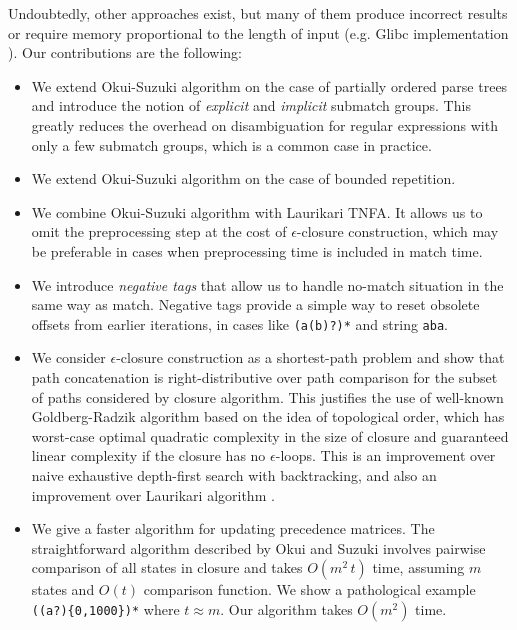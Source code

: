 \documentclass[AMA,STIX1COL]{WileyNJD-v2}
\begin{document}
Undoubtedly, other approaches exist,
but many of them produce incorrect results or require memory proportional to the length of input
(e.g. Glibc implementation \cite{Glibc}).
%
Our contributions are the following:
\begin{itemize}[itemsep=0.5em, topsep=0.5em]

    \item We extend Okui-Suzuki algorithm on the case of partially ordered parse trees
        and introduce the notion of \emph{explicit} and \emph{implicit} submatch groups.
        This greatly reduces the overhead on disambiguation
        for regular expressions with only a few submatch groups,
        which is a common case in practice.

    \item We extend Okui-Suzuki algorithm on the case of bounded repetition.

    \item We combine Okui-Suzuki algorithm with Laurikari TNFA.
        It allows us to omit the preprocessing step
        at the cost of $\epsilon$-closure construction,
        which may be preferable in cases when preprocessing time is included in match time.

    \item We introduce \emph{negative tags} that allow us to handle
        no-match situation in the same way as match.
        Negative tags provide a simple way to reset obsolete offsets from earlier iterations,
        in cases like \texttt{(a(b)?)*} and string \texttt{aba}.

    \item We consider $\epsilon$-closure construction as a shortest-path problem
        and show that path concatenation is right-distributive over path comparison
        for the subset of paths considered by closure algorithm.
        This justifies the use of well-known Goldberg-Radzik algorithm based on the idea of topological order,
        which has worst-case optimal quadratic complexity in the size of closure
        and guaranteed linear complexity if the closure has no $\epsilon$-loops.
        This is an improvement over naive exhaustive depth-first search with backtracking,
        and also an improvement over Laurikari algorithm \cite{Tro17}.

    \item We give a faster algorithm for updating precedence matrices.
        The straightforward algorithm described by Okui and Suzuki involves pairwise comparison of all states in closure
        and takes $O(m^2 \, t)$ time, assuming $m$ states and $O(t)$ comparison function.
        We show a pathological example \texttt{((a?)\{0,1000\})*} where $t \approx m$.
        Our algorithm takes $O(m^2)$ time.


\end{itemize}
\end{document}
